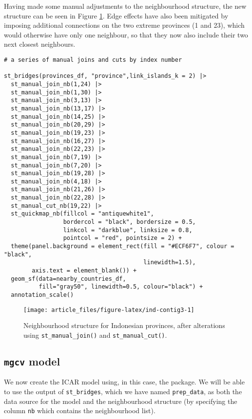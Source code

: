 Having made some manual adjustments to the neighbourhood structure, the
new structure can be seen in Figure \ref{fig:ind-contig3}. Edge effects
have also been mitigated by imposing additional connections on the two extreme
provinces (1 and 23), which would otherwise have only one neighbour, so that they now also include
their two next closest neighbours.



\begin{verbatim}
# a series of manual joins and cuts by index number

st_bridges(provinces_df, "province",link_islands_k = 2) |> 
  st_manual_join_nb(1,24) |> 
  st_manual_join_nb(1,30) |> 
  st_manual_join_nb(3,13) |> 
  st_manual_join_nb(13,17) |> 
  st_manual_join_nb(14,25) |> 
  st_manual_join_nb(20,29) |>
  st_manual_join_nb(19,23) |> 
  st_manual_join_nb(16,27) |> 
  st_manual_join_nb(22,23) |> 
  st_manual_join_nb(7,19) |> 
  st_manual_join_nb(7,20) |>
  st_manual_join_nb(19,28) |> 
  st_manual_join_nb(4,18) |> 
  st_manual_join_nb(21,26) |> 
  st_manual_join_nb(22,28) |> 
  st_manual_cut_nb(19,22) |> 
  st_quickmap_nb(fillcol = "antiquewhite1", 
                 bordercol = "black", bordersize = 0.5, 
                 linkcol = "darkblue", linksize = 0.8, 
                 pointcol = "red", pointsize = 2) + 
  theme(panel.background = element_rect(fill = "#ECF6F7", colour = "black", 
                                        linewidth=1.5),
        axis.text = element_blank()) +
  geom_sf(data=nearby_countries_df, 
          fill="gray50", linewidth=0.5, colour="black") + 
  annotation_scale()
\end{verbatim}

\begin{figure}

{\centering \texttt{[image: article\_files/figure-latex/ind-contig3-1]} 

}

\caption{Neighbourhood structure for Indonesian provinces, after alterations using \texttt{st\_manual\_join()} and \texttt{st\_manual\_cut()}.}\label{fig:ind-contig3}
\end{figure}

\hypertarget{mgcv-model}{%
\subsection{\texorpdfstring{\texttt{mgcv} model}{mgcv model}}\label{mgcv-model}}

We now create the ICAR model using, in this case, the  package. We will be able to use the output of \texttt{st\_bridges}, which we have named \texttt{prep\_data}, as both the data source for the model and the neighbourhood structure (by specifying the column \texttt{nb} which contains the neighbourhood list).

